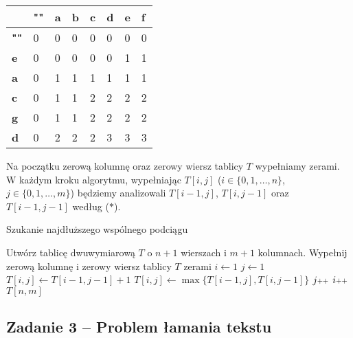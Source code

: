 \begin{table}[H]
	\center
	\begin{tabular}{|l|lllllll|}
		\hline
		& \multicolumn{1}{l|}{\textbf{""}} & \multicolumn{1}{l|}{\textbf{a}} & \multicolumn{1}{l|}{\textbf{b}} & \multicolumn{1}{l|}{\textbf{c}} & \multicolumn{1}{l|}{\textbf{d}} & \multicolumn{1}{l|}{\textbf{e}} & \multicolumn{1}{l|}{\textbf{f}} \\ \hline
		\textbf{""} & 0 & 0 & 0 & 0 & 0 & 0 & 0 \\ \cline{1-1}
		\textbf{e}  & 0 & 0 & 0 & 0 & 0 & 1 & 1 \\ \cline{1-1}
		\textbf{a}  & 0 & 1 & 1 & 1 & 1 & 1 & 1 \\ \cline{1-1}
		\textbf{c}  & 0 & 1 & 1 & 2 & 2 & 2 & 2 \\ \cline{1-1}
		\textbf{g}  & 0 & 1 & 1 & 2 & 2 & 2 & 2 \\ \cline{1-1}
		\textbf{d}  & 0 & 2 & 2 & 2 & 3 & 3 & 3 \\ \cline{1-1}
		\hline
	\end{tabular}
	\caption{}
	\label{tab_zad12}
\end{table}

Na początku zerową kolumnę oraz zerowy wiersz tablicy $T$
wypełniamy zerami. W każdym kroku algorytmu, wypełniając $T[i, j]$
($i \in \{0,1, \dots, n\}$, $j \in \{0,1, \dots, m\}$)
będziemy analizowali $T[i-1, j]$, $T[i, j-1]$ oraz $T[i-1,j-1]$ według ($\ast$).


\begin{algorithm}[H]
	\caption{Szukanie najdłuższego wspólnego podciągu}\label{Zadanie12}
	\begin{algorithmic}[1]
		\State Utwórz tablicę dwuwymiarową $T$ o $n+1$ wierszach i $m+1$ kolumnach.
		\State Wypełnij zerową kolumnę i zerowy wiersz tablicy $T$ zerami
		\State $i \gets 1$
		\State $j \gets 1$
		\State $T[i, j] \gets T[i-1,j-1] + 1$
		\Else
		\State $T[i, j] \gets \max\{T[i-1,j], T[i,j-1]\}$
		\EndIf
		\State $j \pp$
		\EndWhile
		\State $i \pp$
		\EndWhile
		\State \Return $T[n, m]$
		\EndProcedure 
	\end{algorithmic}
\end{algorithm}


\subsection{Zadanie 3 -- Problem łamania tekstu}
